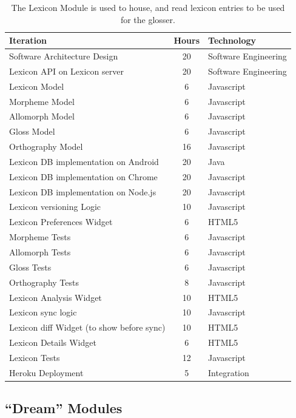 \documentclass[12pt]{article}
\begin{document}
\begin{table}[htbp]
\begin{center}
  \begin{tabular}{ | lcl | }
\hline

Iteration&  Hours&  Technology  \\
\hline
Software Architecture Design& 20& Software Engineering  \\ 
Lexicon API on Lexicon server&  20& Software Engineering\\ 
Lexicon Model&  6&  Javascript  \\ 
Morpheme Model& 6&  Javascript  \\ 
Allomorph Model&  6&  Javascript  \\ 
Gloss Model&  6&  Javascript  \\ 
Orthography Model&  16& Javascript  \\ 
Lexicon DB  implementation on Android&  20& Java  \\ 
Lexicon DB  implementation on Chrome& 20& Javascript  \\ 
Lexicon DB  implementation on Node.js&  20& Javascript \\ 
Lexicon versioning Logic& 10& Javascript  \\ 
Lexicon Preferences Widget& 6&  HTML5 \\ 
Morpheme Tests& 6&  Javascript  \\ 
Allomorph Tests&  6&  Javascript \\ 
Gloss Tests&  6&  Javascript  \\ 
Orthography Tests&  8&  Javascript \\ 
Lexicon Analysis Widget&  10&  HTML5 \\ 
Lexicon sync logic& 10&  Javascript \\ 
Lexicon diff Widget (to show before sync)&  10&  HTML5 \\ 
Lexicon Details Widget& 6&  HTML5 \\
Lexicon Tests&  12&  Javascript \\  
Heroku Deployment&  5&  Integration \\ 
\hline
  \end{tabular}
 \caption{The Lexicon Module is used to house, and read lexicon entries to be used for the glosser.}
 \label{table-lexicon}
  \end{center}
  

\end{table}

\subsection{``Dream'' Modules}
\end{document}
